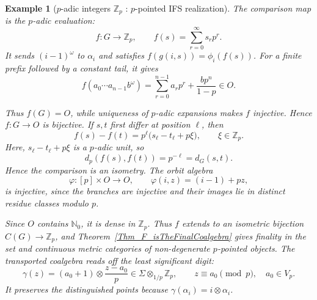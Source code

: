 \documentclass{sn-jnl}%
\theoremstyle{thmstyleone}%
\theoremstyle{thmstyletwo}%
\newtheorem{example}{Example}%
\theoremstyle{thmstylethree}%
\newcommand{\M}{\Sigma}
\newcommand{\Fww}[1]{\M\otimes_{#1}}
\newcommand{\f}{\phi}
\begin{document}
\begin{example}[$p$-adic integers $\mathbb Z_p$ : $p$-pointed IFS realization]
    The comparison map is the $p$-adic evaluation:
    \begin{equation} 
    \nonumber
        f:G\longrightarrow\mathbb Z_p,\qquad  f(s)=\sum_{r=0}^{\infty}s_rp^r.
    \end{equation}
    It sends $(i-1)^\omega$ to $\alpha_i$ and satisfies $f(g(i,s))=\f_i(f(s))$. For a finite prefix followed by a constant tail, it gives
    \begin{equation} 
    \nonumber
        f(a_0\cdots a_{n-1}b^\omega)  =  \sum_{r=0}^{n-1}a_rp^r+\frac{bp^n}{1-p} \in O.
    \end{equation}
    
    Thus $f(G)=O$, while uniqueness of $p$-adic expansions makes $f$ injective. Hence $f:G\to O$ is bijective. If $s,t$ first differ at position $\ell$, then
    \begin{equation} 
    \nonumber
        f(s)-f(t) = p^\ell\bigl(s_\ell-t_\ell+p\xi\bigr), \qquad \xi\in\mathbb Z_p.
    \end{equation}
    Here, $s_\ell-t_\ell+p\xi$ is a $p$-adic unit, so
    \begin{equation} 
    \nonumber
        d_p(f(s),f(t))=p^{-\ell}=d_G(s,t).
    \end{equation}
    Hence the comparison is an isometry. The orbit algebra
    \begin{equation} 
    \nonumber
        \varphi:[p]\times O\longrightarrow O,\qquad \varphi(i,z)=(i-1)+pz,
    \end{equation}
    is injective, since the branches are injective and their images lie in distinct residue classes modulo $p$.
    
    Since $O$ contains $\mathbb N_0$, it is dense in $\mathbb Z_p$. Thus $f$ extends to an isometric bijection $C(G)\to\mathbb Z_p$, and Theorem~\ref{Thm_F_isTheFinalCoalgebra} gives finality in the set and continuous metric categories of non-degenerate $p$-pointed objects. The transported coalgebra reads off the least significant digit:
    \begin{equation} 
    \nonumber
        \gamma(z)=(a_0+1) \otimes \frac{z-a_0}{p} \in \Fww{1/p} \mathbb Z_p,      \qquad z\equiv a_0\pmod p,\quad a_0\in V_p.
    \end{equation}
    It preserves the distinguished points because $\gamma(\alpha_i)=i\otimes\alpha_i$.
\end{example}
\end{document}
